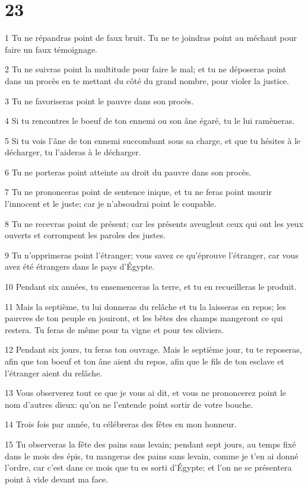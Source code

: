 \chapter{23}

\par 1 Tu ne répandras point de faux bruit. Tu ne te joindras point au méchant pour faire un faux témoignage.
\par 2 Tu ne suivras point la multitude pour faire le mal; et tu ne déposeras point dans un procès en te mettant du côté du grand nombre, pour violer la justice.
\par 3 Tu ne favoriseras point le pauvre dans son procès.
\par 4 Si tu rencontres le boeuf de ton ennemi ou son âne égaré, tu le lui ramèneras.
\par 5 Si tu vois l'âne de ton ennemi succombant sous sa charge, et que tu hésites à le décharger, tu l'aideras à le décharger.
\par 6 Tu ne porteras point atteinte au droit du pauvre dans son procès.
\par 7 Tu ne prononceras point de sentence inique, et tu ne feras point mourir l'innocent et le juste; car je n'absoudrai point le coupable.
\par 8 Tu ne recevras point de présent; car les présents aveuglent ceux qui ont les yeux ouverts et corrompent les paroles des justes.
\par 9 Tu n'opprimeras point l'étranger; vous savez ce qu'éprouve l'étranger, car vous avez été étrangers dans le pays d'Égypte.
\par 10 Pendant six années, tu ensemenceras la terre, et tu en recueilleras le produit.
\par 11 Mais la septième, tu lui donneras du relâche et tu la laisseras en repos; les pauvres de ton peuple en jouiront, et les bêtes des champs mangeront ce qui restera. Tu feras de même pour ta vigne et pour tes oliviers.
\par 12 Pendant six jours, tu feras ton ouvrage. Mais le septième jour, tu te reposeras, afin que ton boeuf et ton âne aient du repos, afin que le fils de ton esclave et l'étranger aient du relâche.
\par 13 Vous observerez tout ce que je vous ai dit, et vous ne prononcerez point le nom d'autres dieux: qu'on ne l'entende point sortir de votre bouche.
\par 14 Trois fois par année, tu célébreras des fêtes en mon honneur.
\par 15 Tu observeras la fête des pains sans levain; pendant sept jours, au temps fixé dans le mois des épis, tu mangeras des pains sans levain, comme je t'en ai donné l'ordre, car c'est dans ce mois que tu es sorti d'Égypte; et l'on ne se présentera point à vide devant ma face.
